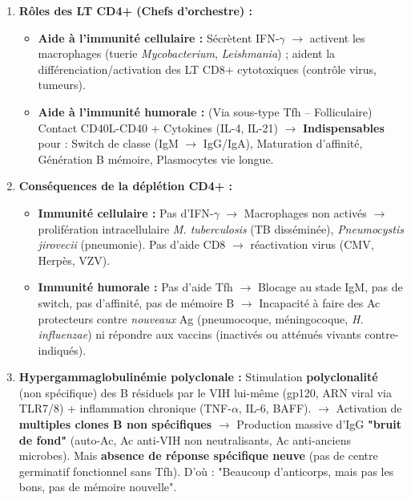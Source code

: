 \documentclass[11pt]{article}
\begin{document}
\begin{corrige}
\begin{enumerate}
    \item \textbf{Rôles des LT CD4+ (Chefs d'orchestre) :}
    \begin{itemize}
        \item \textbf{Aide à l'immunité cellulaire :} Sécrètent IFN-$\gamma$ $\to$ activent les macrophages (tuerie \emph{Mycobacterium}, \emph{Leishmania}) ; aident la différenciation/activation des LT CD8+ cytotoxiques (contrôle virus, tumeurs).
        \item \textbf{Aide à l'immunité humorale :} (Via sous-type Tfh -- Folliculaire) Contact CD40L-CD40 + Cytokines (IL-4, IL-21) $\to$ \textbf{Indispensables} pour : Switch de classe (IgM $\to$ IgG/IgA), Maturation d'affinité, Génération B mémoire, Plasmocytes vie longue.
    \end{itemize}
    \item \textbf{Conséquences de la déplétion CD4+ :}
    \begin{itemize}
        \item \textbf{Immunité cellulaire :} Pas d'IFN-$\gamma$ $\to$ Macrophages non activés $\to$ prolifération intracellulaire \emph{M. tuberculosis} (TB disséminée), \emph{Pneumocystis jirovecii} (pneumonie). Pas d'aide CD8 $\to$ réactivation virus (CMV, Herpès, VZV).
        \item \textbf{Immunité humorale :} Pas d'aide Tfh $\to$ Blocage au stade IgM, pas de switch, pas d'affinité, pas de mémoire B $\to$ Incapacité à faire des Ac protecteurs contre \emph{nouveaux} Ag (pneumocoque, méningocoque, \emph{H. influenzae}) ni répondre aux vaccins (inactivés ou atténués vivants contre-indiqués).
    \end{itemize}
    \item \textbf{Hypergammaglobulinémie polyclonale :} Stimulation \textbf{polyclonalité} (non spécifique) des B résiduels par le VIH lui-même (gp120, ARN viral via TLR7/8) + inflammation chronique (TNF-$\alpha$, IL-6, BAFF). $\to$ Activation de \textbf{multiples clones B non spécifiques} $\to$ Production massive d'IgG \textbf{"bruit de fond"} (auto-Ac, Ac anti-VIH non neutralisants, Ac anti-anciens microbes). Mais \textbf{absence de réponse spécifique neuve} (pas de centre germinatif fonctionnel sans Tfh). D'où : "Beaucoup d'anticorps, mais pas les bons, pas de mémoire nouvelle".
\end{enumerate}
\end{corrige}
\end{document}
